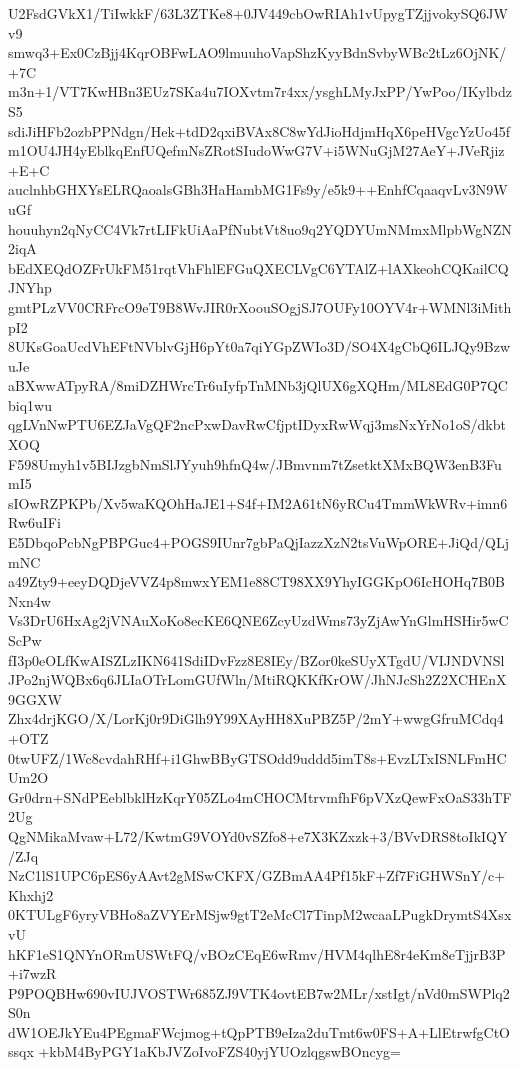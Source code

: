 U2FsdGVkX1/TiIwkkF/63L3ZTKe8+0JV449cbOwRIAh1vUpygTZjjvokySQ6JWv9
smwq3+Ex0CzBjj4KqrOBFwLAO9lmuuhoVapShzKyyBdnSvbyWBc2tLz6OjNK/+7C
m3n+1/VT7KwHBn3EUz7SKa4u7IOXvtm7r4xx/ysghLMyJxPP/YwPoo/IKylbdzS5
sdiJiHFb2ozbPPNdgn/Hek+tdD2qxiBVAx8C8wYdJioHdjmHqX6peHVgcYzUo45f
m1OU4JH4yEblkqEnfUQefmNsZRotSIudoWwG7V+i5WNuGjM27AeY+JVeRjiz+E+C
auclnhbGHXYsELRQaoalsGBh3HaHambMG1Fs9y/e5k9++EnhfCqaaqvLv3N9WuGf
houuhyn2qNyCC4Vk7rtLIFkUiAaPfNubtVt8uo9q2YQDYUmNMmxMlpbWgNZN2iqA
bEdXEQdOZFrUkFM51rqtVhFhlEFGuQXECLVgC6YTAlZ+lAXkeohCQKailCQJNYhp
gmtPLzVV0CRFrcO9eT9B8WvJIR0rXoouSOgjSJ7OUFy10OYV4r+WMNl3iMithpI2
8UKsGoaUcdVhEFtNVblvGjH6pYt0a7qiYGpZWIo3D/SO4X4gCbQ6ILJQy9BzwuJe
aBXwwATpyRA/8miDZHWrcTr6uIyfpTnMNb3jQlUX6gXQHm/ML8EdG0P7QCbiq1wu
qgLVnNwPTU6EZJaVgQF2ncPxwDavRwCfjptIDyxRwWqj3msNxYrNo1oS/dkbtXOQ
F598Umyh1v5BIJzgbNmSlJYyuh9hfnQ4w/JBmvnm7tZsetktXMxBQW3enB3FumI5
sIOwRZPKPb/Xv5waKQOhHaJE1+S4f+IM2A61tN6yRCu4TmmWkWRv+imn6Rw6uIFi
E5DbqoPcbNgPBPGuc4+POGS9IUnr7gbPaQjIazzXzN2tsVuWpORE+JiQd/QLjmNC
a49Zty9+eeyDQDjeVVZ4p8mwxYEM1e88CT98XX9YhyIGGKpO6IcHOHq7B0BNxn4w
Vs3DrU6HxAg2jVNAuXoKo8ecKE6QNE6ZcyUzdWms73yZjAwYnGlmHSHir5wCScPw
fI3p0eOLfKwAISZLzIKN641SdiIDvFzz8E8IEy/BZor0keSUyXTgdU/VIJNDVNSl
JPo2njWQBx6q6JLIaOTrLomGUfWln/MtiRQKKfKrOW/JhNJcSh2Z2XCHEnX9GGXW
Zhx4drjKGO/X/LorKj0r9DiGlh9Y99XAyHH8XuPBZ5P/2mY+wwgGfruMCdq4+OTZ
0twUFZ/1Wc8cvdahRHf+i1GhwBByGTSOdd9uddd5imT8s+EvzLTxISNLFmHCUm2O
Gr0drn+SNdPEeblbklHzKqrY05ZLo4mCHOCMtrvmfhF6pVXzQewFxOaS33hTF2Ug
QgNMikaMvaw+L72/KwtmG9VOYd0vSZfo8+e7X3KZxzk+3/BVvDRS8toIkIQY/ZJq
NzC1lS1UPC6pES6yAAvt2gMSwCKFX/GZBmAA4Pf15kF+Zf7FiGHWSnY/c+Khxhj2
0KTULgF6yryVBHo8aZVYErMSjw9gtT2eMcCl7TinpM2wcaaLPugkDrymtS4XsxvU
hKF1eS1QNYnORmUSWtFQ/vBOzCEqE6wRmv/HVM4qlhE8r4eKm8eTjjrB3P+i7wzR
P9POQBHw690vIUJVOSTWr685ZJ9VTK4ovtEB7w2MLr/xstIgt/nVd0mSWPlq2S0n
dW1OEJkYEu4PEgmaFWcjmog+tQpPTB9eIza2duTmt6w0FS+A+LlEtrwfgCtOssqx
+kbM4ByPGY1aKbJVZoIvoFZS40yjYUOzlqgswBOncyg=
